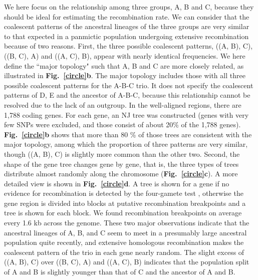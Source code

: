 \documentclass[twoside,twocolumn, letterpaper]{article}
\begin{document}
We here focus on the relationship among three groups, A, B and C, because they should be ideal for estimating the recombination rate. We can consider that the coalescent patterns of the ancestral lineages of the three groups are very similar to that expected in a panmictic population undergoing extensive recombination because of two reasons. First, the three possible coalescent patterns, ((A, B), C), ((B, C), A) and ((A, C), B), appear with nearly identical frequencies. We here define the ``major topology" such that A, B and C are more closely related, as illustrated in {\bf Fig.~\ref{circle}b}. The major topology includes those with all three possible coalescent patterns for the A-B-C trio. It does not specify the coalescent patterns of D, E and the ancestor of A-B-C, because this relationship cannot be resolved due to the lack of an outgroup. In the well-aligned regions, there are 1,788 coding genes. For each gene, an NJ tree was constructed (genes with very few SNPs were excluded, and those consist of about 20\% of the 1,788 genes). {\bf Fig.~\ref{circle}b} shows that more than 80 \% of those trees are consistent with the major topology, among which the proportion of three patterns are very similar, though ((A, B), C) is slightly more common than the other two. Second, the shape of the gene tree changes gene by gene, that is, the three types of trees distribute almost randomly along the chromosome ({\bf Fig.~\ref{circle}c}). A more detailed view is shown in {\bf Fig.~\ref{circle}d}. A tree is shown for a 
 gene if no evidence for recombination is detected by the four-gamete test \cite[]{Hudson_1985_4029609}, otherwise the gene region is divided into blocks at putative recombination breakpoints and a tree is shown for each block. We found recombination breakpoints on average every 1.6 kb across the genome. These two major observations indicate that the ancestral lineages of A, B, and C seem to meet in a presumably large ancestral population quite recently, and extensive homologous recombination makes the coalescent pattern of the trio in each gene nearly random. The slight excess of ((A, B), C) over ((B, C), A) and ((A, C), B) indicates that the population split of A and B is slightly younger than that of C and the ancestor of A and B. 
\end{document}
